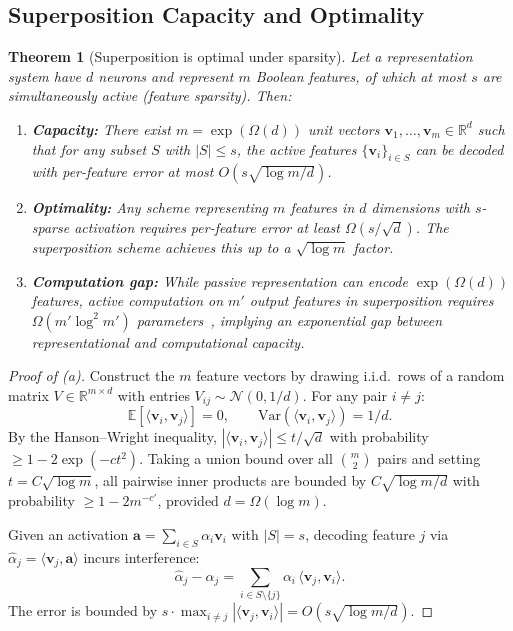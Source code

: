 \documentclass[11pt,a4paper]{article}
\theoremstyle{plain}
\newtheorem{theorem}{Theorem}[section]
\theoremstyle{definition}
\theoremstyle{remark}
\newcommand{\R}{\mathbb{R}}
\newcommand{\E}{\mathbb{E}}
\newcommand{\cN}{\mathcal{N}}
\newcommand{\ip}[2]{\langle #1, #2 \rangle}
\begin{document}
\subsection{Superposition Capacity and Optimality}\label{sec:superposition-thm}

\begin{theorem}[Superposition is optimal under sparsity]%
\label{thm:superposition}
Let a representation system have $d$ neurons and represent $m$ Boolean features,
of which at most $s$ are simultaneously active (feature sparsity).  Then:
\begin{enumerate}[label=\textup{(\alph*)},leftmargin=2.5em]
  \item \textbf{Capacity:} There exist $m = \exp(\Omega(d))$ unit vectors
    $\mathbf{v}_1,\ldots,\mathbf{v}_m \in \R^d$ such that for any subset $S$
    with $|S| \leq s$, the active features $\{\mathbf{v}_i\}_{i\in S}$ can be
    decoded with per-feature error at most
    $O(s\sqrt{\log m / d})$.

  \item \textbf{Optimality:} Any scheme representing $m$ features in $d$
    dimensions with $s$-sparse activation requires per-feature error at least
    $\Omega(s/\sqrt{d})$.  The superposition scheme achieves this up to a
    $\sqrt{\log m}$ factor.

  \item \textbf{Computation gap:}
    While passive \emph{representation} can encode $\exp(\Omega(d))$ features,
    active \emph{computation} on $m'$ output features in superposition
    requires $\Omega(m'\log^2 m')$ parameters~\citep{adler2024complexity},
    implying an exponential gap between representational and computational
    capacity.
\end{enumerate}
\end{theorem}

\begin{proof}[Proof of (a)]
Construct the $m$ feature vectors by drawing i.i.d.\ rows of a random matrix
$V \in \R^{m\times d}$ with entries $V_{ij} \sim \cN(0,1/d)$.  For any pair
$i\neq j$:
\[
  \E[\ip{\mathbf{v}_i}{\mathbf{v}_j}] = 0, \qquad
  \mathrm{Var}(\ip{\mathbf{v}_i}{\mathbf{v}_j}) = 1/d.
\]
By the Hanson--Wright inequality, $|\ip{\mathbf{v}_i}{\mathbf{v}_j}| \leq
t/\sqrt{d}$ with probability $\geq 1 - 2\exp(-ct^2)$.  Taking a union bound
over all $\binom{m}{2}$ pairs and setting $t = C\sqrt{\log m}$, all pairwise
inner products are bounded by $C\sqrt{\log m / d}$ with probability
$\geq 1 - 2m^{-c'}$, provided $d = \Omega(\log m)$.

Given an activation $\mathbf{a} = \sum_{i\in S} \alpha_i \mathbf{v}_i$ with
$|S| = s$, decoding feature $j$ via $\hat{\alpha}_j = \ip{\mathbf{v}_j}{\mathbf{a}}$
incurs interference:
\[
  \hat{\alpha}_j - \alpha_j = \sum_{i\in S\setminus\{j\}} \alpha_i\,
  \ip{\mathbf{v}_j}{\mathbf{v}_i}.
\]
The error is bounded by
$s \cdot \max_{i\neq j}|\ip{\mathbf{v}_j}{\mathbf{v}_i}| =
O(s\sqrt{\log m / d})$.
\end{proof}
\end{document}
